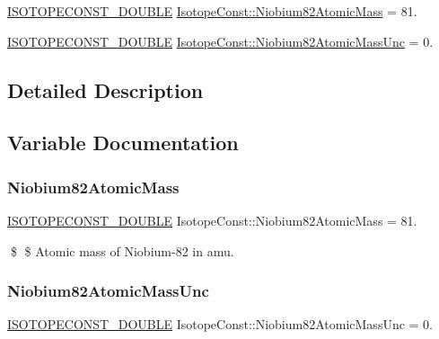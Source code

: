 \begin{DoxyCompactItemize}
\item 
\mbox{\hyperlink{group___isotope_const-_macros_ga8f45a7272ce02c0b4c65c44636ed719a}{I\+S\+O\+T\+O\+P\+E\+C\+O\+N\+S\+T\+\_\+\+D\+O\+U\+B\+LE}} \mbox{\hyperlink{group___isotope_const-_niobium-_nb82_gadc41e0d7091db998efc1a0a052dc542d}{Isotope\+Const\+::\+Niobium82\+Atomic\+Mass}} = 81.
\item 
\mbox{\hyperlink{group___isotope_const-_macros_ga8f45a7272ce02c0b4c65c44636ed719a}{I\+S\+O\+T\+O\+P\+E\+C\+O\+N\+S\+T\+\_\+\+D\+O\+U\+B\+LE}} \mbox{\hyperlink{group___isotope_const-_niobium-_nb82_ga0236d07209eec6431c9697816216e517}{Isotope\+Const\+::\+Niobium82\+Atomic\+Mass\+Unc}} = 0.
\end{DoxyCompactItemize}


\subsection{Detailed Description}


\subsection{Variable Documentation}
\mbox{\label{group___isotope_const-_niobium-_nb82_gadc41e0d7091db998efc1a0a052dc542d}} 
\subsubsection{\texorpdfstring{Niobium82\+Atomic\+Mass}{Niobium82AtomicMass}}
{\footnotesize\ttfamily \mbox{\hyperlink{group___isotope_const-_macros_ga8f45a7272ce02c0b4c65c44636ed719a}{I\+S\+O\+T\+O\+P\+E\+C\+O\+N\+S\+T\+\_\+\+D\+O\+U\+B\+LE}} Isotope\+Const\+::\+Niobium82\+Atomic\+Mass = 81.}

\$ \$ Atomic mass of Niobium-\/82 in amu. \mbox{\label{group___isotope_const-_niobium-_nb82_ga0236d07209eec6431c9697816216e517}} 
\subsubsection{\texorpdfstring{Niobium82\+Atomic\+Mass\+Unc}{Niobium82AtomicMassUnc}}
{\footnotesize\ttfamily \mbox{\hyperlink{group___isotope_const-_macros_ga8f45a7272ce02c0b4c65c44636ed719a}{I\+S\+O\+T\+O\+P\+E\+C\+O\+N\+S\+T\+\_\+\+D\+O\+U\+B\+LE}} Isotope\+Const\+::\+Niobium82\+Atomic\+Mass\+Unc = 0.}


